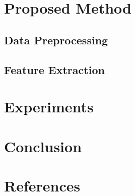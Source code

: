 \documentclass{article}
\begin{document}
\section{Proposed Method}
\subsection{Data Preprocessing}
\subsection{Feature Extraction}
\section{Experiments}
\section{Conclusion}
\section{References}


\end{document}

